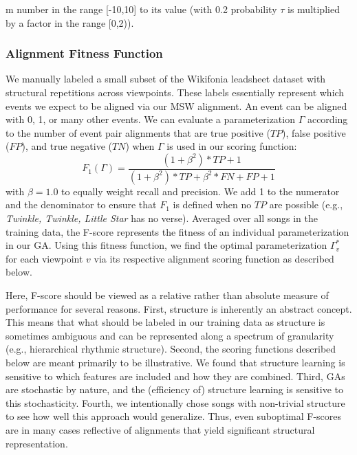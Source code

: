 \documentclass[phd,electronic,oneside,twosidetoc,letterpaper,chaptercenter,parttop,lol,lof,lot]{byumsphd}
\begin{document}
m number in the range [-10,10] to its value (with 0.2 probability $\tau$ is multiplied by a factor in the range [0,2)).

\subsubsection{Alignment Fitness Function}
We manually labeled a small subset of the Wikifonia leadsheet dataset with structural repetitions across viewpoints. These labels essentially represent which events we expect to be aligned via our MSW alignment. An event can be aligned with 0, 1, or many other events. We can evaluate a parameterization $\Gamma$ according to the number of event pair alignments that are true positive ($TP$), false positive ($FP$), and true negative ($TN$) when $\Gamma$ is used in our scoring function: %
\[ 
F_{1}(\Gamma)=\frac{(1+\beta^2) * TP + 1}{(1+\beta^2) * TP + \beta^2 * FN + FP + 1}
\]
\noindent with $\beta=1.0$ to equally weight recall and precision. We add 1 to the numerator and the denominator to ensure that $F_1$ is defined when no $TP$ are possible (e.g., \textit{Twinkle, Twinkle, Little Star} has no verse). Averaged over all songs in the training data, the F-score represents the fitness of an individual parameterization in our GA. Using this fitness function, we find the optimal parameterization $\Gamma^*_v$ for each viewpoint $v$ %
via its respective alignment scoring function as described below.

Here, F-score should be viewed as a relative rather than absolute measure of performance for several reasons. First, structure is inherently an abstract concept. This means that what should be labeled in our training data as structure is sometimes ambiguous and can be represented along a spectrum of granularity (e.g., hierarchical rhythmic structure). Second, the scoring functions described below are meant primarily to be illustrative. We found that structure learning is sensitive to which features are included and how they are combined. Third, GAs are stochastic by nature, and the (efficiency of) structure learning is sensitive to this stochasticity. %
Fourth, we intentionally chose songs with non-trivial structure to see how well this approach would generalize. Thus, even suboptimal F-scores are in many cases reflective of alignments that yield significant structural representation.
\end{document}
